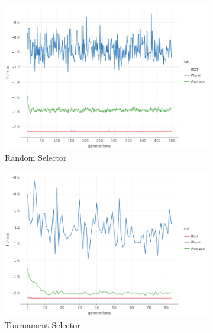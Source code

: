   \begin{figure}[ht!]
    \centering
    \begin{subfigure}{.45\textwidth}
      \centering
      \includegraphics[width=\linewidth]{img/cross_in_tray_random.png}
      \caption{Random Selector}
    \end{subfigure}
    \begin{subfigure}{.45\textwidth}
      \centering
      \includegraphics[width=\linewidth]{img/cross_in_tray_tournament.png}
      \caption{Tournament Selector}
    \end{subfigure}
    \begin{subfigure}{.45\textwidth}
      \centering

\end{subfigure}
\end{figure}
